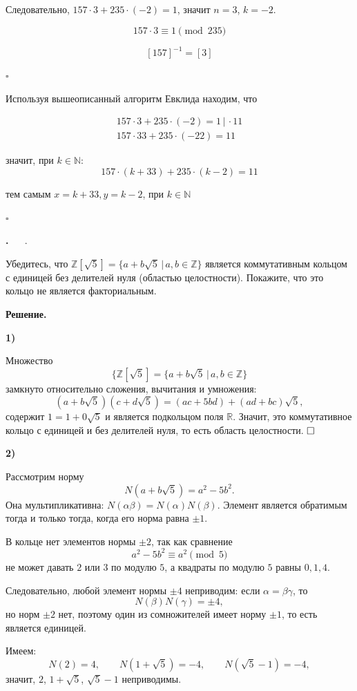 \documentclass[12pt,a4paper]{article}
\newcounter{task}                   %
\newenvironment{task}[1][]{%
  \refstepcounter{task}%
  \par\vspace{0.3\baselineskip}%
  \noindent\textbf{\thetask.}%
  \if\relax\detokenize{#1}\relax   %
    \ \ignorespaces                 %
  \else
    \ \textbf{#1}.\ \ignorespaces   %
  \fi
}{%
  \par\vspace{0.2\baselineskip}%
}
\newcommand{\sol}{%
  \par\vspace{0.3\baselineskip}%
  \noindent\textbf{Решение.}\ %
  \ignorespaces                     %
}
\newcommand{\soli}[1]{%
  \par\vspace{0.15\baselineskip}%
  \noindent\textbf{#1)}\ %
  \ignorespaces                     %
}
\begin{document}
Следовательно, \(157 \cdot 3 + 235 \cdot (-2) = 1\), значит \(n = 3\), \(k = -2\).

\[
    157 \cdot 3 \equiv 1 \pmod{235}
\]

\[
    \boxed{[157]^{-1} = [3]}
\]

\hfill $\square$

Используя вышеописанный алгоритм Евклида находим, что 

\[
\begin{aligned}
    157 \cdot 3 + 235 \cdot (-2) = 1 \, | \, \cdot 11\\
    157 \cdot 33 + 235 \cdot (-22) = 11
\end{aligned}
\]

значит, при $k \in \mathbb{N}$:
\[
    157 \cdot (k + 33) + 235 \cdot (k - 2) = 11
\]

тем самым $x = k + 33, y = k - 2$, при $k \in \mathbb{N}$

\hfill $\square$

\begin{task}
    Убедитесь, что $\mathbb{Z} [ \sqrt{5} ] = \{ a + b \sqrt{5} \, | \, a,b \in \mathbb{Z} \}$   является коммутативным кольцом с единицей без делителей нуля (областью целостности). Покажите, что это кольцо не является факториальным.
\end{task}

\sol
\soli{1}
Множество  
\[
   \{ \mathbb{Z} [ \sqrt{5} ] = \{ a + b \sqrt{5} \, | \,  a,b \in \mathbb{Z} \}
\]
замкнуто относительно сложения, вычитания и умножения:
\[
(a+b\sqrt5)(c+d\sqrt5)=(ac+5bd)+(ad+bc)\sqrt5,
\]
содержит $1=1+0\sqrt5$ и является подкольцом поля $\mathbb R$. Значит, это коммутативное кольцо с единицей и без делителей нуля, то есть область целостности. $\hfill \square$

\soli{2}
Рассмотрим норму
\[
N(a+b\sqrt5)=a^2-5b^2.
\]
Она мультипликативна: $N(\alpha\beta)=N(\alpha)N(\beta)$. Элемент является обратимым тогда и только тогда, когда его норма равна $\pm1$.

В кольце нет элементов нормы $\pm2$, так как сравнение
\[
a^2-5b^2\equiv a^2\pmod 5
\]
не может давать $2$ или $3$ по модулю $5$, а квадраты по модулю $5$ равны $0,1,4$.

Следовательно, любой элемент нормы $\pm4$ неприводим: если $\alpha=\beta\gamma$, то
\[
N(\beta)N(\gamma)=\pm4,
\]
но норм $\pm2$ нет, поэтому один из сомножителей имеет норму $\pm1$, то есть является единицей.

Имеем:
\[
N(2)=4,\qquad N(1+\sqrt5)=-4,\qquad N(\sqrt5-1)=-4,
\]
значит, $2$, $1+\sqrt5$, $\sqrt5-1$ неприводимы.
\end{document}
